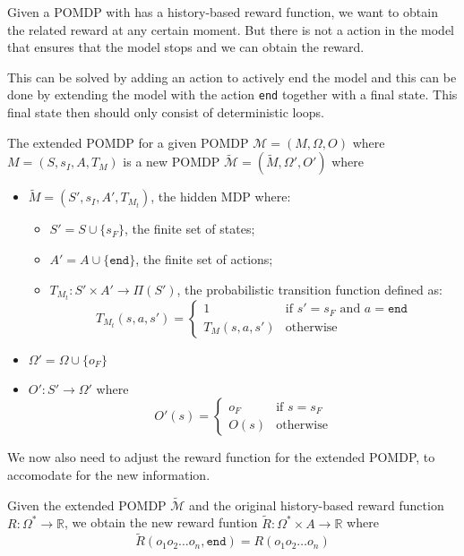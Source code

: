 \label{s:extended_pomdp}
Given a POMDP with has a history-based reward function, we want to obtain the related reward at any certain moment. But there is not a action in the model that ensures that the model stops and we can obtain the reward. 

This can be solved by adding an action to actively end the model and this can be done by extending the model with the action \texttt{end} together with a final state. This final state then should only consist of deterministic loops.

\begin{definition}
	The extended POMDP for a given POMDP $\mathcal{M}=(M,\Omega,O)$ where $M=(S,s_I,A,T_{M})$ is a new POMDP $\widetilde{\mathcal{M}} = (\widetilde{M},\Omega',O')$ where
		\begin{itemize}
		\item $\widetilde{M} = (S',s_I,A',T_{M_t})$, the hidden MDP where:
		\begin{itemize}
			\item $S'=S\cup \{s_F\}$, the finite set of states;
			\item $A'=A\cup \{\texttt{end}\}$, the finite set of actions;
			\item $T_{M_t}:S'\times A' \to \Pi(S')$, the probabilistic transition function defined as:
			\[ T_{M_t}(s,a,s') = \begin{cases}
						1 & \text{if } s'=s_F \text{ and } a = \texttt{end}\\
						T_M(s,a,s') & \text{otherwise} 
					\end{cases} \]
		\end{itemize}
	\item $\Omega'= \Omega\cup \{o_F\}$
	\item $O' : S' \to \Omega'$ where 
		\[ O'(s) = \begin{cases}
			o_F & \text{if } s=s_F \\
			O(s) & \text{otherwise} 
			\end{cases} \]
	\end{itemize}
	\label{d:extended_pomdp}
\end{definition}

We now also need to adjust the reward function for the extended POMDP, to accomodate for the new information.
\begin{definition}
	\label{def:reward-mdp}
	Given the extended POMDP $\widetilde{\mathcal{M}}$ and the original history-based reward function $R:\Omega^*\to \mathbb{R}$, we obtain the new reward funtion $\widetilde{R}:\Omega^*\times A\to\mathbb{R}$  where 
	\[\widetilde{R}(o_1 o_2\dots o_n,\texttt{end}) = 
		R(o_1 o_2 \dots o_{n})\]
\end{definition}
